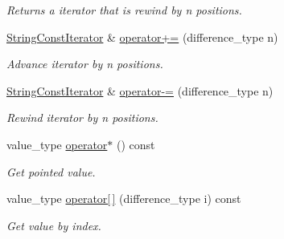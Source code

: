\begin{DoxyCompactItemize}
\begin{DoxyCompactList}\small\item\em Returns a iterator that is rewind by n positions. \end{DoxyCompactList}\item 
\hyperlink{struct_mdt_1_1_plain_text_1_1_string_const_iterator}{String\+Const\+Iterator} \& \hyperlink{struct_mdt_1_1_plain_text_1_1_string_const_iterator_a2fdef53991d8a75174f6254ad4664c08}{operator+=} (difference\+\_\+type n)\hypertarget{struct_mdt_1_1_plain_text_1_1_string_const_iterator_a2fdef53991d8a75174f6254ad4664c08}{}\label{struct_mdt_1_1_plain_text_1_1_string_const_iterator_a2fdef53991d8a75174f6254ad4664c08}

\begin{DoxyCompactList}\small\item\em Advance iterator by n positions. \end{DoxyCompactList}\item 
\hyperlink{struct_mdt_1_1_plain_text_1_1_string_const_iterator}{String\+Const\+Iterator} \& \hyperlink{struct_mdt_1_1_plain_text_1_1_string_const_iterator_a20fc6889ac0e76812a993014f4d8e13b}{operator-\/=} (difference\+\_\+type n)\hypertarget{struct_mdt_1_1_plain_text_1_1_string_const_iterator_a20fc6889ac0e76812a993014f4d8e13b}{}\label{struct_mdt_1_1_plain_text_1_1_string_const_iterator_a20fc6889ac0e76812a993014f4d8e13b}

\begin{DoxyCompactList}\small\item\em Rewind iterator by n positions. \end{DoxyCompactList}\item 
value\+\_\+type \hyperlink{struct_mdt_1_1_plain_text_1_1_string_const_iterator_ad23073b28d2844ad3e3555608e4a9bd5}{operator$\ast$} () const \hypertarget{struct_mdt_1_1_plain_text_1_1_string_const_iterator_ad23073b28d2844ad3e3555608e4a9bd5}{}\label{struct_mdt_1_1_plain_text_1_1_string_const_iterator_ad23073b28d2844ad3e3555608e4a9bd5}

\begin{DoxyCompactList}\small\item\em Get pointed value. \end{DoxyCompactList}\item 
value\+\_\+type \hyperlink{struct_mdt_1_1_plain_text_1_1_string_const_iterator_a8a9673923bfd2e0af6f31b9f98ef8f46}{operator\mbox{[}$\,$\mbox{]}} (difference\+\_\+type i) const \hypertarget{struct_mdt_1_1_plain_text_1_1_string_const_iterator_a8a9673923bfd2e0af6f31b9f98ef8f46}{}\label{struct_mdt_1_1_plain_text_1_1_string_const_iterator_a8a9673923bfd2e0af6f31b9f98ef8f46}

\begin{DoxyCompactList}\small\item\em Get value by index. \end{DoxyCompactList}\end{DoxyCompactItemize}

